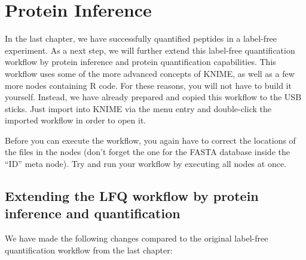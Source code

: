 \section{Protein Inference}

In the last chapter, we have successfully quantified peptides in a label-free experiment. As a next step, we will
further extend this label-free quantification workflow by protein inference and protein quantification capabilities.
This workflow uses some of the more advanced concepts of KNIME, as well as a few more nodes containing R code.
For these reasons, you will not have to build it yourself. Instead, we have already
prepared and copied this workflow to the USB sticks. Just import  into KNIME
via the menu entry  and double-click the imported workflow in order to open it.

Before you can execute the workflow, you again have to correct the locations of the files in the  nodes (don't forget the one for the FASTA database inside the ``ID'' meta node). Try and run your workflow by 
executing all nodes at once.

\subsection{Extending the LFQ workflow by protein inference and quantification}

We have made the following changes compared to the original label-free quantification workflow from the last chapter:

